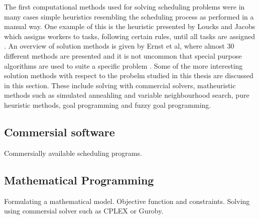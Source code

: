The first computational methods used for solving scheduling problems were in many cases simple heuristics resembling the scheduling process as performed in a manual way. One example of this is the heuristic presented by Loucks and Jacobs which assigns workers to tasks, following certain rules, until all tasks are assigned \citet{loucks_1991}. An overview of solution methods is given by Ernst et al, where almost 30 different methods are presented  and it is not uncommon that special purpose algorithms are used to suite a specific problem \citet{ernst_2004}. Some of the more interesting solution methods with respect to the probelm studied in this thesis are discussed in this section. These include solving with commercial solvers, matheuristic methods such as simulated anneahling and variable neighbourhood search, pure heuristic methods, goal programming and fuzzy goal programming.  



\subsection{Commersial software}

Commersially available scheduling programs.

\subsection{Mathematical Programming}

Formulating a mathematical model. Objective function and constraints. Solving using commersial solver such as CPLEX or Guroby.


